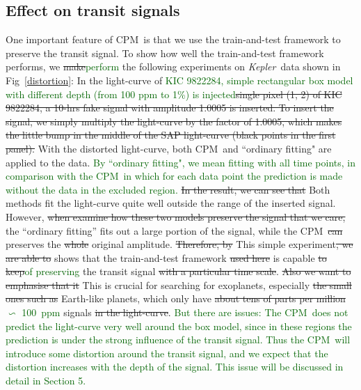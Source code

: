 \documentclass[12pt, preprint]{aastex}
\newcommand{\project}[1]{\textsl{#1}}
\newcommand{\Kepler}{\project{Kepler}}
\newcommand{\name}{CPM}
\newcommand{\revise}[1]{\textcolor{darkgreen}{#1}}
\newcommand{\remove}[1]{\sout{#1}}
\begin{document}
\subsection{Effect on transit signals}
One important feature of \name\ is that we use the train-and-test framework to preserve 
the transit signal. To show how well the train-and-test framework performs, we \remove{make}\revise{perform} the
following experiments on \Kepler\ data shown in Fig~\ref{distortion}:
In the light-curve of \revise{KIC 9822284, simple rectangular box model with different depth (from 100 ppm to 1\%) is injected}\remove{single pixel (1, 2) of KIC 9822284, a 10-hrs fake signal 
with amplitude 1.0005 is inserted. To insert the signal, we simply multiply the light-curve 
by the factor of 1.0005, which makes the little bump in the middle of the SAP light-curve 
(black points in the first panel).} With the distorted light-curve, both \name\ and ``ordinary fitting" are applied to the data. 
\revise{By ``ordinary fitting", we mean fitting with all time points,  in comparison with the \name\, in which for each data point the prediction is made without the data in the excluded region.}  
\remove{In the result, we can see that} Both methods fit the light-curve quite well outside the range of the inserted signal. 
However, \remove{when examine how these two models preserve the signal that we care,} the ``ordinary fitting'' fits out a large portion of the signal, while the \name\ \remove{can} preserves the \remove{whole} original amplitude. 
\remove{Therefore,  by} This simple experiment\remove{, we are able to} shows that the train-and-test framework \remove{used here} is capable \remove{to keep}\revise{of preserving} the transit signal \remove{with a particular time scale}. 
\remove{Also we want to emphasise that it} This is crucial for searching for
exoplanets, especially \remove{the small ones such as} Earth-like planets, which only have \remove{about tens of parts per million}\revise{$\backsim$ 100\ ppm} signals \remove{in the light-curve}. \revise{But there are issues: 
The \name\ does not predict the light-curve very well around the box model, since in these regions the prediction is under the strong influence of the transit signal. 
Thus the \name\ will introduce some distortion around the transit signal, and \revise{we expect that} the distortion increases with the depth of the signal. This issue will be discussed in detail in Section 5.}
\end{document}

